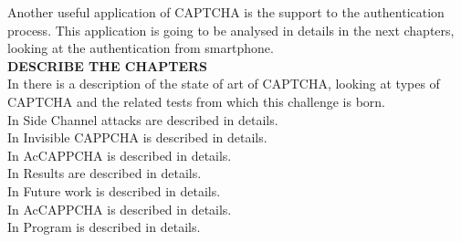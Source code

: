 Another useful application of CAPTCHA is the support to the authentication process. This application is going to be analysed in details in the next chapters, looking at the authentication from smartphone.\\
\textbf{DESCRIBE THE CHAPTERS}\\
In  there is a description of the state of art of CAPTCHA, looking at types of CAPTCHA and the related tests from which this challenge is born.\\
In  Side Channel attacks are described in details.\\
In  Invisible CAPPCHA is described in details.\\
In  AcCAPPCHA is described in details.\\In {} Results are described in details.\\
In  Future work is described in details.\\
In  AcCAPPCHA is described in details.\\
In  Program is described in details.\\